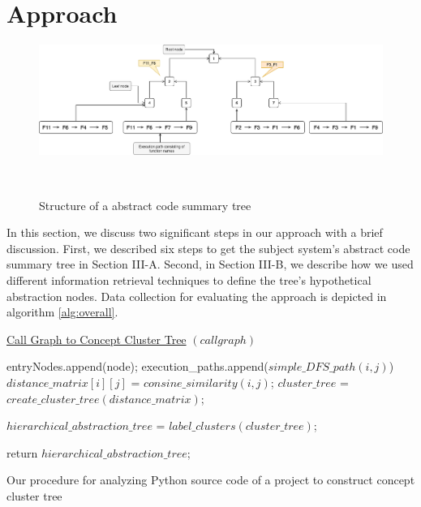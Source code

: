 \section{Approach}
\label{hla2:approach}
\begin{figure}[tb]
  \centering
  \includegraphics[width=\columnwidth]{figures/hla2/tree_structure.png}
  \caption{Structure of a abstract code summary tree}~\label{fig:tree_structure}
\end{figure}
In this section, we discuss two significant steps in our approach with a brief discussion. First, we described six steps to get the subject system's abstract code summary tree in Section III-A. Second, in Section III-B, we describe how we used different information retrieval techniques to define the tree's hypothetical abstraction nodes. Data collection for evaluating the approach is depicted in algorithm \ref{alg:overall}.


\begin{algorithm}
    
    \underline{Call Graph to Concept Cluster Tree} $(call graph)$\;
    
    {
        {
            entryNodes.append(node);
        }
    } 
    {
        {
            execution\_paths.append($simple\_DFS\_path(i, j)$)
        }
    }
    {
        {
            $distance\_matrix[i][j]$ = $consine\_similarity(i,j)$;
        }
    }
    $cluster\_tree$ = $create\_cluster\_tree(distance\_matrix)$;
    
    $hierarchical\_abstraction\_tree$ = $label\_clusters(cluster\_tree)$;
    
    return $hierarchical\_abstraction\_tree$;
    \caption{Our procedure for analyzing Python source code of a project to construct concept cluster tree}
    \label{alg:overall}
\end{algorithm}


